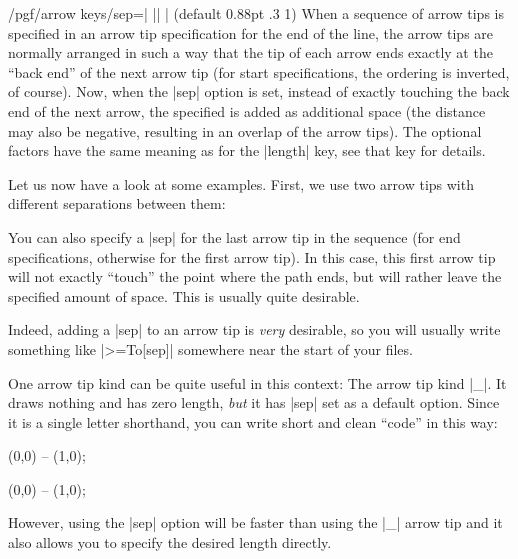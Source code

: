 \begin{key}{/pgf/arrow keys/sep=| || | (default 0.88pt .3 1)%
}
    When a sequence of arrow tips is specified in an arrow tip specification
    for the end of the line, the arrow tips are normally arranged in such a way
    that the tip of each arrow ends exactly at the ``back end'' of the next
    arrow tip (for start specifications, the ordering is inverted, of course).
    Now, when the |sep| option is set, instead of exactly touching the back end
    of the next arrow, the specified  is added as additional
    space (the distance may also be negative, resulting in an overlap of the
    arrow tips). The optional factors have the same meaning as for the |length|
    key, see that key for details.

    Let us now have a look at some examples. First, we use two arrow tips with
    different separations between them:
\begin{codeexample}[]
\end{codeexample}

    You can also specify a |sep| for the last arrow tip in the sequence (for
    end specifications, otherwise for the first arrow tip). In this case, this
    first arrow tip will not exactly ``touch'' the point where the path ends,
    but will rather leave the specified amount of space. This is usually quite
    desirable.
\begin{codeexample}[preamble={\usetikzlibrary{positioning}}]
\end{codeexample}
    Indeed, adding a |sep| to an arrow tip is \emph{very} desirable, so you
    will usually write something like |>={To[sep]}| somewhere near the start of
    your files.

    One arrow tip kind can be quite useful in this context: The arrow tip kind
    |_|. It draws nothing and has zero length, \emph{but} it has |sep| set as a
    default option. Since it is a single letter shorthand, you can write short
    and clean ``code'' in this way:
\begin{codeexample}[]
\tikz \draw [->_>] (0,0) -- (1,0);
\end{codeexample}
\begin{codeexample}[]
\tikz \draw [->__>] (0,0) -- (1,0);
\end{codeexample}
    However, using the |sep| option will be faster than using the |_| arrow tip
    and it also allows you to specify the desired length directly.
\end{key}


